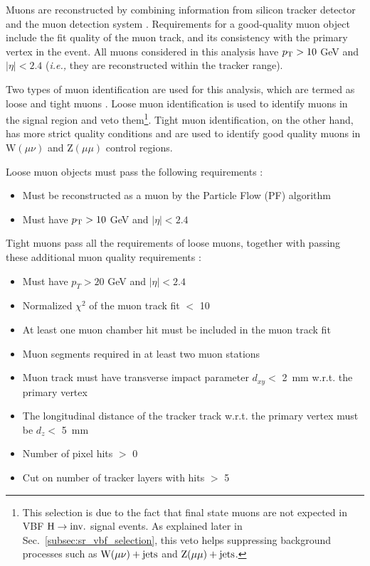 Muons are reconstructed by combining information from silicon tracker detector and the muon detection system
\cite{cms:muon_paper}. Requirements for a good-quality muon object include the fit quality of the
muon track, and its consistency with the primary vertex in the event. All muons considered in this
analysis have $p_{\textrm{T}} > 10$ GeV and $|\eta| < 2.4$ (\textit{i.e.,} they are reconstructed within the tracker range).

Two types of muon identification are used for this analysis, which are termed as loose and tight muons \cite{CMS-MUO-TWIKI-IDLOOSE,CMS-MUO-TWIKI-IDTIGHT}.
Loose muon identification is used to identify muons in the signal region and veto them\footnote{This selection is due to the fact that
final state muons are not expected in VBF $\textrm{H} \rightarrow \textrm{inv.}$ signal events. As explained later in Sec.~\ref{subsec:sr_vbf_selection}, this veto
helps suppressing background processes such as $\textrm{W}(\mu\nu)+\textrm{jets}$ and $\mathrm{Z}(\mu\mu)+\textrm{jets}$.}. 
Tight muon identification, on the other hand,
has more strict quality conditions and are used to identify good quality muons in $\textrm{W}(\mu \nu)$ and $\textrm{Z}(\mu \mu)$ control regions.

Loose muon objects must pass the following requirements \cite{CMS-MUO-TWIKI-IDLOOSE}:

\begin{itemize}
    \item Must be reconstructed as a muon by the Particle Flow (PF) algorithm
    \item Must have $p_{\textrm{T}} > 10$ GeV and $|\eta| < 2.4$
\end{itemize}

Tight muons pass all the requirements of loose muons, together with passing these additional muon quality requirements \cite{CMS-MUO-TWIKI-IDTIGHT}:

\begin{itemize}
    \item Must have $p_T > 20$ GeV and $|\eta| < 2.4$
    \item Normalized $\chi^2$ of the muon track fit $<$ 10
    \item At least one muon chamber hit must be included in the muon track fit
    \item Muon segments required in at least two muon stations
    \item Muon track must have transverse impact parameter $d_{xy} < $ 2~mm w.r.t. the primary vertex
    \item The longitudinal distance of the tracker track w.r.t. the primary vertex must be $d_z < $ 5~mm
    \item Number of pixel hits $>$ 0
    \item Cut on number of tracker layers with hits $>$ 5
\end{itemize}

